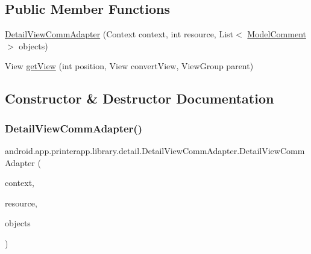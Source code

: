 \subsection*{Public Member Functions}
\begin{DoxyCompactItemize}
\item 
\hyperlink{classandroid_1_1app_1_1printerapp_1_1library_1_1detail_1_1_detail_view_comm_adapter_a63b516d4941163e62fee103c68195c6b}{Detail\+View\+Comm\+Adapter} (Context context, int resource, List$<$ \hyperlink{classandroid_1_1app_1_1printerapp_1_1model_1_1_model_comment}{Model\+Comment} $>$ objects)
\item 
View \hyperlink{classandroid_1_1app_1_1printerapp_1_1library_1_1detail_1_1_detail_view_comm_adapter_ac1085a3be76291aba18401a13dddebf8}{get\+View} (int position, View convert\+View, View\+Group parent)
\end{DoxyCompactItemize}


\subsection{Constructor \& Destructor Documentation}
\mbox{\label{classandroid_1_1app_1_1printerapp_1_1library_1_1detail_1_1_detail_view_comm_adapter_a63b516d4941163e62fee103c68195c6b}} 
\subsubsection{\texorpdfstring{Detail\+View\+Comm\+Adapter()}{DetailViewCommAdapter()}}
{\footnotesize\ttfamily android.\+app.\+printerapp.\+library.\+detail.\+Detail\+View\+Comm\+Adapter.\+Detail\+View\+Comm\+Adapter (\begin{DoxyParamCaption}\item[{Context}]{context,  }\item[{int}]{resource,  }\item[{List$<$ \hyperlink{classandroid_1_1app_1_1printerapp_1_1model_1_1_model_comment}{Model\+Comment} $>$}]{objects }\end{DoxyParamCaption})}



